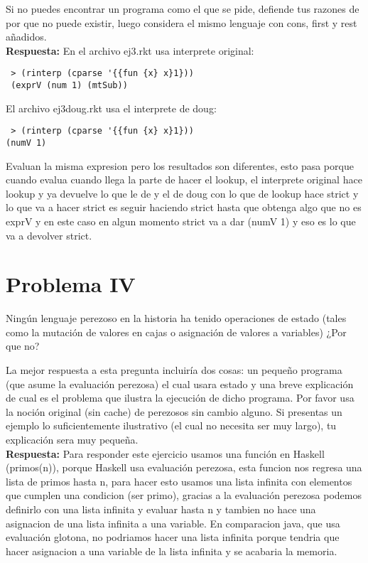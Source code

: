 \documentclass{article}
\begin{document}
Si no puedes encontrar un programa como el que se pide, defiende tus razones
de por que no puede existir, luego considera el mismo lenguaje con cons, first
y rest añadidos.
\\

\textbf{Respuesta: }
En el archivo ej3.rkt usa interprete original:
\begin{verbatim}
 > (rinterp (cparse '{{fun {x} x}1}))
 (exprV (num 1) (mtSub))
\end{verbatim}
El archivo ej3doug.rkt usa el interprete de doug:
\begin{verbatim}
 > (rinterp (cparse '{{fun {x} x}1}))
(numV 1)
\end{verbatim}
Evaluan la misma expresion pero los resultados son diferentes, esto pasa porque cuando 
evalua cuando llega la parte de hacer el lookup, el interprete original hace lookup y
ya devuelve lo que le de y el de doug con lo que de lookup hace strict y lo que va a hacer
strict es seguir haciendo strict hasta que obtenga algo que no es exprV y en este caso
en algun momento strict va a dar (numV 1) y eso es lo que va a devolver strict. 


\section*{Problema IV}
Ningún lenguaje perezoso en la historia ha tenido operaciones de estado (tales
como la mutación de valores en cajas o asignación de valores a variables) ¿Por
que no?

La mejor respuesta a esta pregunta incluiría dos cosas: un pequeño programa (que
asume la evaluación perezosa) el cual usara estado y una breve explicación de cual
es el problema que ilustra la ejecución de dicho programa. Por favor usa la
noción original (sin cache) de perezosos sin cambio alguno. Si presentas un
ejemplo lo suficientemente ilustrativo (el cual no necesita ser muy largo), tu
explicación sera muy pequeña.
\\

\textbf{Respuesta: }
Para responder este ejercicio usamos una función en Haskell (primos(n)), porque Haskell usa evaluación perezosa, esta funcion nos regresa una lista de primos hasta n, para hacer esto usamos una lista infinita con elementos que cumplen una condicion (ser primo), gracias a la evaluación perezosa podemos definirlo con una lista infinita y evaluar hasta n y tambien no hace una asignacion de una lista infinita a una variable. En comparacion java, que usa evaluación glotona, no podriamos hacer una lista infinita porque tendria que hacer asignacion a una variable de la lista infinita y se acabaria la memoria.
\end{document}
